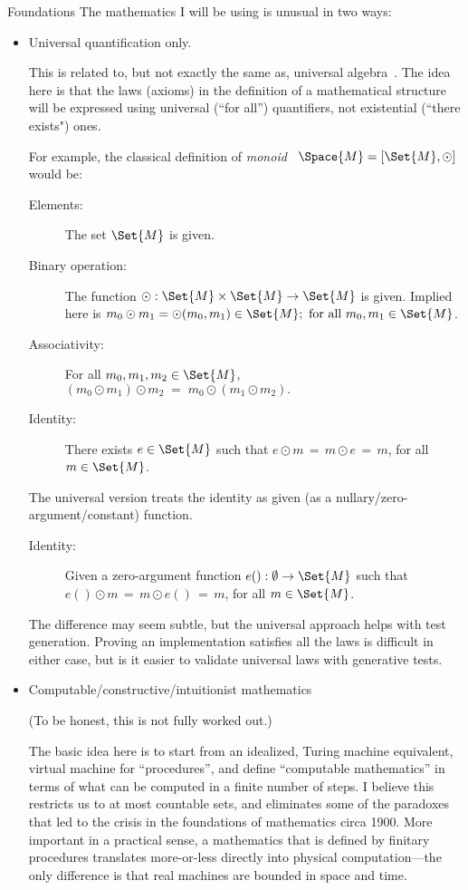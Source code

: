 \documentclass[12pt]{PalisadesLakesBook}
\begin{document}
\begin{plSection}{Foundations}
The mathematics I will be using is unusual in two ways:

\begin{itemize}
  
\item Universal quantification only.

This is related to, but not exactly the same as,
universal algebra~\cite{wiki:UniversalAlgebra}.
The idea here is that the laws (axioms) 
in the definition of a mathematical structure
will be expressed using
universal (``for all'') quantifiers, 
not existential (``there exists") ones.

For example, the classical definition of 
\emph{monoid}~\cite{wiki:Monoid} $\Space{M} = [\Set{M}, \odot]$
would be:
\begin{description}
  \item[Elements:] The set $\Set{M}$ is given.
  \item[Binary operation:] The function
  $\odot : \Set{M} \times \Set{M} \rightarrow \Set{M}$ is given.
  Implied here is 
  $m_0 \odot m_1 = \odot(m_0,m_1) \in \Set{M};
  \text{ for all } m_0, m_1 \in \Set{M}$.
  \item[Associativity:] For all $m_0, m_1, m_2 \in \Set{M}$,
  $(m_0 \odot m_1) \odot m_2 \;=\; m_0 \odot (m_1 \odot m_2).$
  \item[Identity:] There exists $e \in \Set{M}$ such that
  $e \odot m \,=\, m \odot e \,=\, m$,
  for all $m \in \Set{M}$. 
\end{description}
The universal version treats the identity as given
(as a nullary/zero-argument/constant) function.
\begin{description}
  \item[Identity:] Given a zero-argument function 
  $e() : \emptyset \rightarrow \Set{M}$ such that
  $e() \odot m \,=\, m \odot e() \,=\, m$,
  for all $m \in \Set{M}$. 
\end{description}
The difference may seem subtle, but the universal approach
helps with test generation.
Proving an implementation satisfies all the laws is difficult 
in either case, but is it easier to validate
universal laws with generative tests.

\item Computable/constructive/intuitionist mathematics

(To be honest, this is not fully worked out.)

The basic idea here is to start from an
idealized, Turing machine equivalent,
virtual machine for ``procedures'', and define 
``computable mathematics'' in terms of what can be computed 
in a finite number of steps.
I believe this restricts us to at most countable sets,
and eliminates some of the paradoxes that led to the crisis
in the foundations of mathematics circa 1900.
More important in a practical sense, a mathematics that is
defined by finitary procedures translates more-or-less
directly into physical computation---the only difference is 
that real machines are bounded in space and time.


\end{itemize}
\end{plSection}
\end{document}

